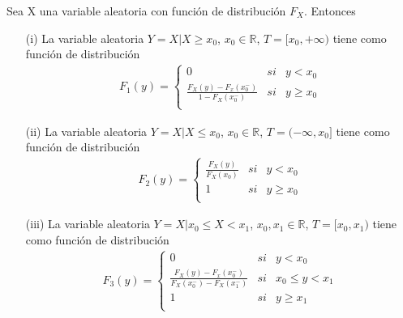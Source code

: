 \begin{prop}
Sea X una variable aleatoria con función de distribución $F_X$. Entonces
\begin{enumerate}
    \item[(i)] La variable aleatoria $Y = X | X \ge x_0$, $x_0 \in \mathbb{R}$, $T = [x_0,+\infty)$ tiene como función de distribución
    \begin{align*}
        F_1(y) = \left\{ \begin{array}{lcc}
             0 &  si  & y < x_0\\
             \frac{F_X(y) - F_x(x_0^-)}{1 - F_X(x_0^-)} &  si  & y \ge x_0\\
             \end{array}
        \right.
    \end{align*}
    \item[(ii)] La variable aleatoria $Y = X | X \leq x_0$, $x_0 \in \mathbb{R}$, $T = (-\infty,x_0]$ tiene como función de distribución
    \begin{align*}
        F_2(y) = \left\{ \begin{array}{lcc}
            \frac{F_X(y)}{F_X(x_0)} &  si  & y < x_0\\
            1 &  si  & y \ge x_0\\
             \end{array}
        \right.
    \end{align*}
    \item[(iii)] La variable aleatoria $Y = X | x_0 \leq X < x_1$, $x_0,x_1 \in \mathbb{R}$, $T = [x_0,x_1)$ tiene como función de distribución
    \begin{align*}
        F_3(y) = \left\{ \begin{array}{lcc}
             0 &  si  & y < x_0\\
             \frac{F_X(y) - F_x(x_0^-)}{F_X(x_0^-) - F_X(x_1^-)} &  si  & x_0 \leq y < x_1\\
             1 &  si  & y \ge x_1\\
             \end{array}
        \right.
    \end{align*}
\end{enumerate}
\end{prop}